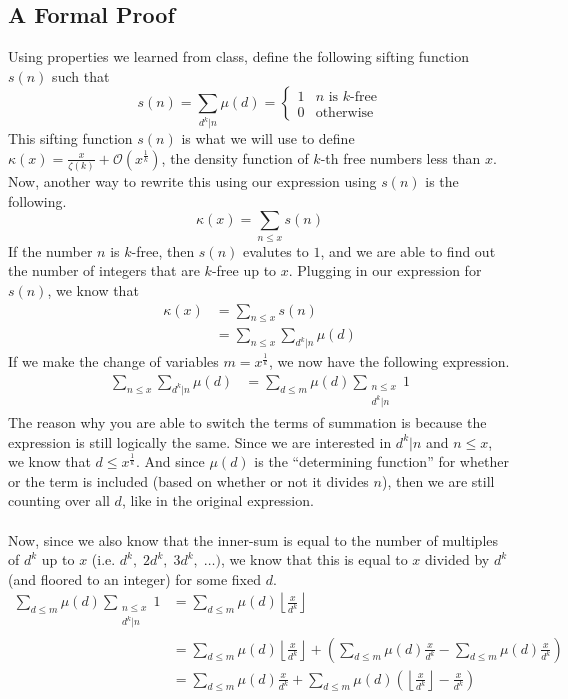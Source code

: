\subsection{A Formal Proof}
Using properties we learned from class, define the following sifting function $s(n)$ such that
$$
s(n) = \sum_{d^k | n} \mu(d) = \begin{cases}
1 & n \text{ is } k\text{-free}\\
0 & \text{otherwise}
\end{cases}
$$
This sifting function $s(n)$ is what we will use to define $\kappa(x) = \frac{x}{\zeta(k)} + \mathcal{O}\left(x^{\frac{1}{k}}\right)$, the density function of $k$-th free numbers less than $x$. Now, another way to rewrite this using our expression using $s(n)$ is the following.
$$
\kappa(x) = \sum_{n \leq x} s(n)
$$
If the number $n$ is $k$-free, then $s(n)$ evalutes to $1$, and we are able to find out the number of integers that are $k$-free up to $x$. Plugging in our expression for $s(n)$, we know that
\begin{align*}
\kappa(x) &= \sum_{n \leq x} s(n) \\
&= \sum_{n \leq x} \sum_{d^k | n} \mu(d)
\end{align*}
If we make the change of variables $m = x^{\frac{1}{k}}$, we now have the following expression.
\begin{align*}
    \sum_{n \leq x} \sum_{d^k | n} \mu(d) &= \sum_{d \leq m} \mu (d)\sum_{\substack{n \leq x \\ d^k | n}} 1
\end{align*}
The reason why you are able to switch the terms of summation is because the expression is still logically the same. Since we are interested in $d^k | n$ and $n \leq x$, we know that $d \leq x^{\frac{1}{k}}$. And since $\mu(d)$ is the ``determining function'' for whether or the term is included (based on whether or not it divides $n$), then we are still counting over all $d$, like in the original expression.\\
\\
Now, since we also know that the inner-sum is equal to the number of multiples of $d^k$ up to $x$ (i.e. $d^k,\;2d^k,\;3d^k,\;\dots)$, we know that this is equal to $x$ divided by $d^k$ (and floored to an integer) for some fixed $d$.
\begin{align*}
    \sum_{d \leq m} \mu (d)\sum_{\substack{n \leq x \\ d^k | n}} 1 &= \sum_{d \leq m} \mu (d) \left\lfloor \frac{x}{d^k} \right\rfloor\\
    &= \sum_{d \leq m} \mu(d) \left\lfloor \frac{x}{d^k} \right\rfloor + \left(\sum_{d \leq m} \mu(d)\frac{x}{d^k} -  \sum_{d \leq m} \mu(d)\frac{x}{d^k} \right)\\
 &= \sum_{d \leq m} \mu(d)\frac{x}{d^k} + \sum_{d \leq m} \mu(d)\left(\left\lfloor \frac{x}{d^k} \right\rfloor - \frac{x}{d^k}\right)
\end{align*}
